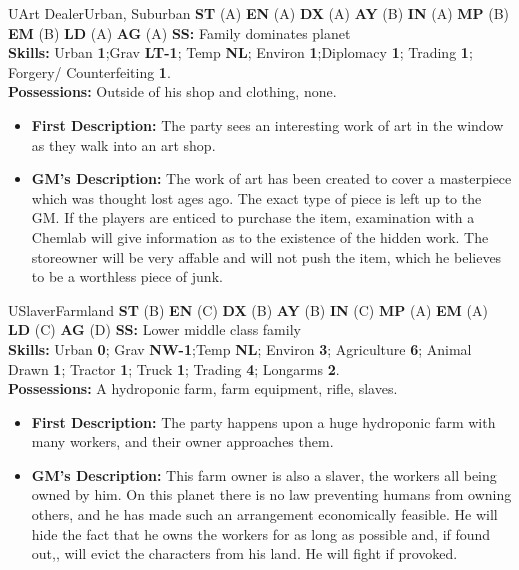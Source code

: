 \hrulefill

\begin{npc}{U}{Art Dealer}{Urban, Suburban}
\textbf{ST} (A) \textbf{EN} (A) \textbf{DX} (A) \textbf{AY} (B) \textbf{IN} (A) \textbf{MP} (B) \textbf{EM} (B) \textbf{LD} (A) \textbf{AG} (A) \textbf{SS:} Family dominates planet \\
\textbf{Skills:} Urban \textbf{1};Grav \textbf{LT-1}; Temp \textbf{NL}; Environ \textbf{1};Diplomacy \textbf{1}; Trading \textbf{1}; Forgery/ Counterfeiting \textbf{1}. \\
\textbf{Possessions:} Outside of his shop and clothing, none. 
\begin{itemize}
\item \textbf{First Description:} The party sees an interesting work of art in the window as they walk into an art shop. 
\item \textbf{GM's Description:} The work of art has been created to cover a masterpiece which was thought lost ages ago. The exact type of 
piece is left up to the GM. If the players are enticed to purchase the item, examination with a Chemlab will give information as to the 
existence of the hidden work. The storeowner will be very affable and will not push the item, which he believes to be a worthless piece 
of junk. 
\end{itemize}
\end{npc}

\hrulefill

\begin{npc}{U}{Slaver}{Farmland}
\textbf{ST} (B) \textbf{EN} (C) \textbf{DX} (B) \textbf{AY} (B) \textbf{IN} (C) \textbf{MP} (A) \textbf{EM} (A) \textbf{LD} (C) \textbf{AG} (D) \textbf{SS:} Lower middle class family \\
\textbf{Skills:} Urban \textbf{0}; Grav \textbf{NW-1};Temp \textbf{NL}; Environ \textbf{3}; Agriculture \textbf{6}; Animal Drawn \textbf{1}; Tractor \textbf{1}; Truck \textbf{1}; Trading \textbf{4}; Longarms \textbf{2}. \\
\textbf{Possessions:} A hydroponic farm, farm equipment, rifle, slaves. 
\begin{itemize}
\item \textbf{First Description:} The party happens upon a huge hydroponic farm with many workers, and their owner approaches them. 
\item \textbf{GM's Description:} This farm owner is also a slaver, the workers all being owned by him. On this planet there is no law preventing 
humans from owning others, and he has made such an arrangement economically feasible. He will hide the fact that he owns the 
workers for as long as possible and, if found out,, will evict the characters from his land. He will fight if provoked. 
\end{itemize}
\end{npc}

